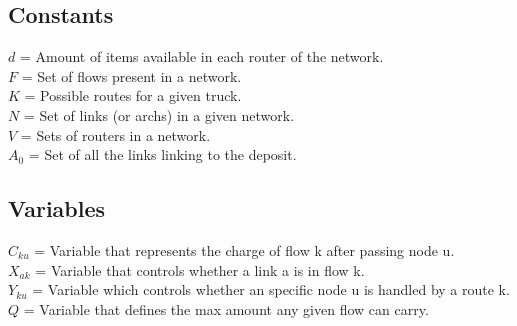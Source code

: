\subsection{Constants}
$d$ = Amount of items available in each router of the network. \\
$F$ = Set of flows present in a network. \\
$K$ = Possible routes for a given truck. \\
$N$ = Set of links (or archs) in a given network. \\
$V$ = Sets of routers in a network. \\
$A_0$ = Set of all the links linking to the deposit. \\

\subsection{Variables}
$C_{ku}$ =  Variable that represents the charge of flow k after passing node u. \\
$X_{ak}$ =  Variable that controls whether a link a is in flow k. \\ 
$Y_{ku}$ =  Variable which controls whether an specific node u is handled by a route k.\\
$Q$ = Variable that defines the max amount any given flow can carry.

